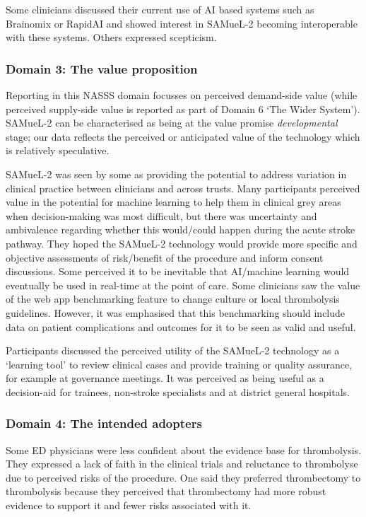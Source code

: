 Some clinicians discussed their current use of AI based systems such as Brainomix or RapidAI and showed interest in SAMueL-2 becoming interoperable with these systems. Others expressed scepticism.

\subsubsection{Domain 3: The value proposition}

Reporting in this NASSS domain focusses on perceived demand-side value (while perceived supply-side value is reported as part of Domain 6 ‘The Wider System’). SAMueL-2 can be characterised as being at the value promise \textit{developmental} stage; our data reflects the perceived or anticipated value of the technology which is relatively speculative.

SAMueL-2 was seen by some as providing the potential to address variation in clinical practice between clinicians and across trusts. Many participants perceived value in the potential for machine learning to help them in clinical grey areas when decision-making was most difficult, but there was uncertainty and ambivalence regarding whether this would/could happen during the acute stroke pathway. They hoped the SAMueL-2 technology would provide more specific and objective assessments of risk/benefit of the procedure and inform consent discussions. Some perceived it to be inevitable that AI/machine learning would eventually be used in real-time at the point of care. Some clinicians saw the value of the web app benchmarking feature to change culture or local thrombolysis guidelines. However, it was emphasised that this benchmarking should include data on patient complications and outcomes for it to be seen as valid and useful.

Participants discussed the perceived utility of the SAMueL-2 technology as a ‘learning tool’ to review clinical cases and provide training or quality assurance, for example at governance meetings. It was perceived as being useful as a decision-aid for trainees, non-stroke specialists and at district general hospitals.

\subsubsection{Domain 4: The intended adopters}

Some ED physicians were less confident about the evidence base for thrombolysis. They expressed a lack of faith in the clinical trials and reluctance to thrombolyse due to perceived risks of the procedure. One said they preferred thrombectomy to thrombolysis because they perceived that thrombectomy had more robust evidence to support it and fewer risks associated with it.

